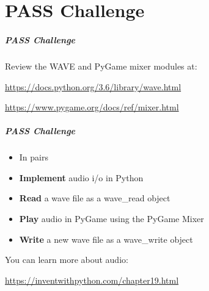 \part{PASS Challenge}
\frame{\partpage}

\begin{frame}
	\frametitle{PASS Challenge}
	
	Review the WAVE and PyGame mixer modules at:
	
	\url{https://docs.python.org/3.6/library/wave.html}
	
	\vspace{1em}
	
	\url{https://www.pygame.org/docs/ref/mixer.html}
\end{frame}	
	
\begin{frame}	
	\frametitle{PASS Challenge}
	\begin{itemize}
		\item In pairs
		\item \textbf{Implement} audio i/o in Python
		\item \textbf{Read} a wave file as a wave\_read object
		\item \textbf{Play} audio in PyGame using the PyGame Mixer
		\item \textbf{Write} a new wave file as a wave\_write object
	\end{itemize}
	
	You can learn more about audio:
	
	\vspace{1em}
	
	 \url{https://inventwithpython.com/chapter19.html}
	
\end{frame}